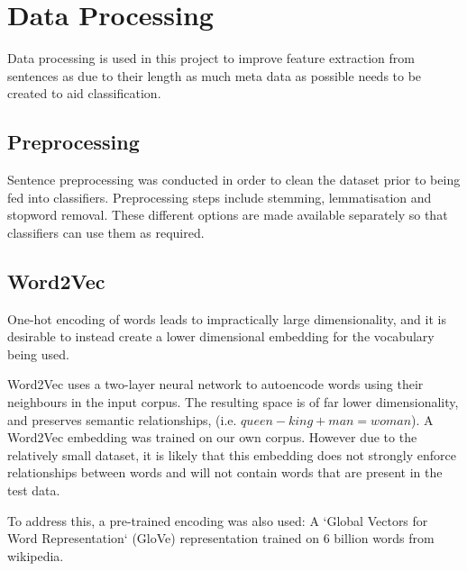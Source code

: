 \section{Data Processing}
\label{sec:data_processing}

Data processing is used in this project to improve feature extraction from sentences as due to their length as much meta data as possible needs to be created to aid classification.

  \subsection{Preprocessing}
  \label{sec:preprocessing}
  	Sentence preprocessing was conducted in order to clean the dataset prior to being fed into classifiers.
  	Preprocessing steps include stemming, lemmatisation and stopword removal. These different options are made available separately so that classifiers can use them as required.

  \subsection{Word2Vec}
  \label{sec:word2vec}
  One-hot encoding of words leads to impractically large dimensionality, and it is desirable to instead create a lower dimensional embedding for the vocabulary being used.
  
  Word2Vec uses a two-layer neural network to autoencode words using their neighbours in the input corpus. The resulting space is of far lower dimensionality, and preserves semantic relationships, (i.e. $queen - king + man = woman$). A Word2Vec embedding was trained on our own corpus. However due to the relatively small dataset, it is likely that this embedding does not strongly enforce relationships between words and will not contain words that are present in the test data.
  
To address this, a pre-trained encoding was also used: A `Global Vectors for Word Representation` (GloVe) representation trained on 6 billion words from wikipedia.
